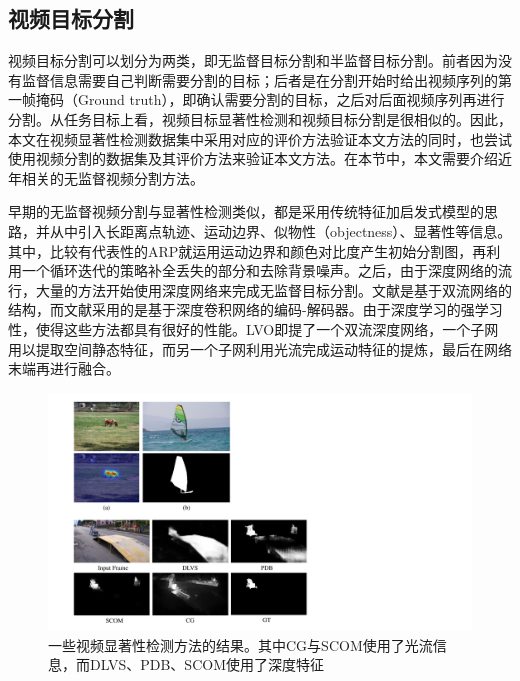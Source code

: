 \subsection{视频目标分割}
视频目标分割可以划分为两类，即无监督目标分割和半监督目标分割。前者因为没有监督信息需要自己判断需要分割的目标；后者是在分割开始时给出视频序列的第一帧掩码（Ground truth），即确认需要分割的目标，之后对后面视频序列再进行分割。从任务目标上看，视频目标显著性检测和视频目标分割是很相似的。因此，本文在视频显著性检测数据集中采用对应的评价方法验证本文方法的同时，也尝试使用视频分割的数据集及其评价方法来验证本文方法。在本节中，本文需要介绍近年相关的无监督视频分割方法。

早期的无监督视频分割与显著性检测类似，都是采用传统特征加启发式模型的思路，并从中引入长距离点轨迹\cite{ochs2013segmentation,fragkiadaki2012video,ochs2011object,chen2015video}、运动边界\cite{papazoglou2013fast,koh2017primary}、似物性（objectness）\cite{lee2011key,ma2012maximum,zhang2013video}、显著性\cite{kowdle2012multiple,wang2015saliency,jang2016primary}等信息。其中，比较有代表性的ARP\cite{koh2017primary}就运用运动边界和颜色对比度产生初始分割图，再利用一个循环迭代的策略补全丢失的部分和去除背景噪声。之后，由于深度网络的流行，大量的方法开始使用深度网络来完成无监督目标分割。文献\cite{tokmakov2017learning,jain2017fusionseg}是基于双流网络的结构，而文献\cite{tokmakov2017learning,cheng2017segflow,li2018instance}采用的是基于深度卷积网络的编码-解码器。由于深度学习的强学习性，使得这些方法都具有很好的性能。LVO\cite{tokmakov2017learning}即提了一个双流深度网络，一个子网用以提取空间静态特征，而另一个子网利用光流完成运动特征的提炼，最后在网络末端再进行融合。

\begin{figure}
\center
\includegraphics[width=1\textwidth]{figures/nomotion}
\caption{一些视频显著性检测方法的结果。其中CG\cite{wang2015consistent}与SCOM\cite{Chen2018TIP}使用了光流信息，而DLVS\cite{8047320}、PDB\cite{song2018pyramid}、SCOM使用了深度特征}
\label{example}
\end{figure}

